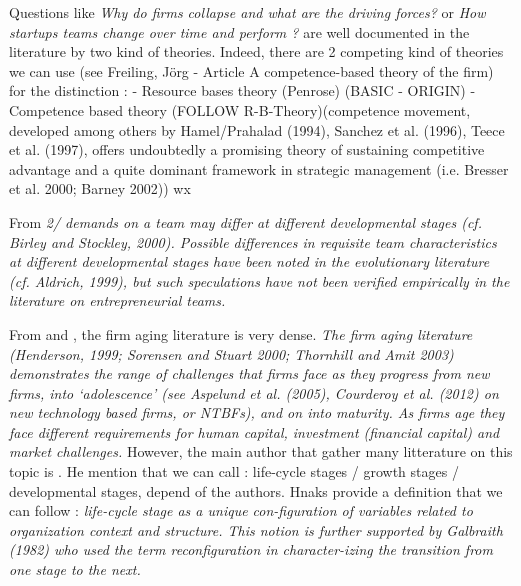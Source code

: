 Questions like \textit{Why do firms collapse and what are the driving forces?} or \textit{How startups teams change over time and perform ?} are well documented in the literature by two kind of theories. Indeed, there are 2 competing kind of theories we can use (see Freiling, Jörg - Article A competence-based theory of the firm) for the distinction :
- Resource bases theory (Penrose) (BASIC - ORIGIN)
- Competence based theory (FOLLOW R-B-Theory)(competence movement, developed among others by Hamel/Prahalad (1994), Sanchez et al. (1996), Teece et al. (1997), offers undoubtedly a promising theory of sustaining competitive advantage and a quite dominant framework in strategic management (i.e. Bresser et al. 2000; Barney 2002))
wx

From \citet{chandler2005antecedents} \textit{2/ demands on a team may differ at different developmental stages (cf. Birley and Stockley, 2000). Possible differences in requisite team characteristics at different developmental stages have been noted in the evolutionary literature (cf. Aldrich, 1999), but such speculations have not been verified empirically in the literature on entrepreneurial teams.}

From \citep{siepel2017non} and \citet{hanks1994tightening}, the firm aging literature is very dense. \textit{The firm aging literature (Henderson, 1999; Sorensen and Stuart 2000; Thornhill and Amit 2003) demonstrates the range of challenges that firms face as they progress from new firms, into ‘adolescence’ (see Aspelund et al. (2005), Courderoy et al. (2012) on new technology based firms, or NTBFs), and on into maturity. As firms age they face different requirements for human capital, investment (financial capital) and market challenges.} However, the main author that gather many litterature on this topic is \citet{hanks1994tightening}. He mention that we can call : life-cycle stages / growth stages / developmental stages, depend of the authors. Hnaks provide a definition that we can follow : \textit{life-cycle stage as a unique con-figuration of variables related to organization context and structure. This notion is further supported by Galbraith (1982) who used the term reconfiguration in character-izing the transition from one stage to the next.}\\

